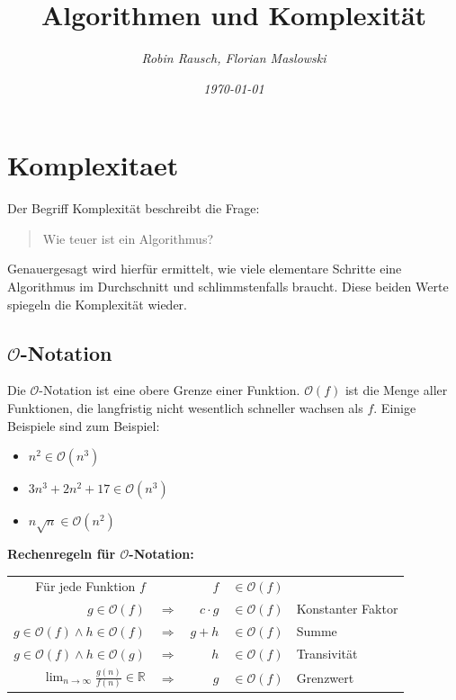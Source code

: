 \documentclass[12pt,a4paper]{article}
\author{\slshape Robin Rausch, Florian Maslowski}
\title{Algorithmen und Komplexität}
\date{\slshape \today}
\begin{document}
\maketitle
\tableofcontents
\newpage
\section{Komplexitaet}
Der Begriff Komplexität beschreibt die Frage:
\begin{quote}
	Wie teuer ist ein Algorithmus?
\end{quote}
Genauergesagt wird hierfür ermittelt, wie viele elementare Schritte eine Algorithmus im Durchschnitt und schlimmstenfalls braucht. Diese beiden Werte spiegeln die Komplexität wieder.
\subsection{$\mathcal{O}$-Notation}
Die $\mathcal{O}$-Notation ist eine obere Grenze einer Funktion. $\mathcal{O}(f)$ ist die Menge aller Funktionen, die langfristig nicht wesentlich schneller wachsen als $f$.
\newline
Einige Beispiele sind zum Beispiel:\newline
\begin{itemize}
	\item $n^2 \in \mathcal{O}(n^3)$
	\item $3n^3 + 2n^2 + 17 \in \mathcal{O}(n^3)$
	\item $n \sqrt{n} \in \mathcal{O}(n^2)$
\end{itemize}
\textbf{Rechenregeln für $\mathcal{O}$-Notation:}
\begin{center}
	\begin{tabularx}{\textwidth}{r c r c l}
		Für jede Funktion $f$ & & $f$ & $\in \mathcal{O}(f)$ & \\
		$g \in \mathcal{O}(f)$ & $\Rightarrow $ & $c \cdot g$ & $\in \mathcal{O}(f)$ & Konstanter Faktor\\
		$g \in \mathcal{O}(f) \wedge h \in \mathcal{O}(f)$ & $\Rightarrow $ & $g + h$ & $\in \mathcal{O}(f)$ & Summe\\
		$g \in \mathcal{O}(f) \wedge h \in \mathcal{O}(g)$ & $\Rightarrow $ & $h$ & $\in \mathcal{O}(f)$ & Transivität\\
		$\lim_{n \to \infty} \frac{g(n)}{f(n)} \in \mathbb{R} $ & $\Rightarrow $ & $g$ & $\in \mathcal{O}(f)$ & Grenzwert\\
	\end{tabularx}
\end{center}
\end{document}
